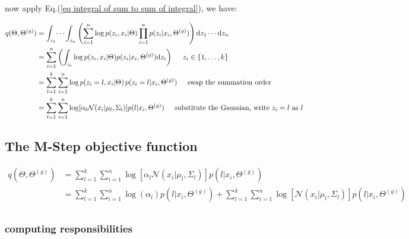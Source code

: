 \documentclass{article}
\def\d{\text{d}}
\begin{document}
now apply Eq.(\ref{eq integral of sum to sum of integral}), we have:

\begin{equation}\begin{split}
q(\Theta, \Theta^{(g)}) &=  \int_{z_1} \dots \int_{z_n} \left( \sum_{i=1}^{n} \log p(z_i , x_i | \Theta) \prod_{i=1}^n p(z_i|x_i,\Theta^{(g)}) \right) \d z_1 \cdots \d z_n \\
&= \sum_{i=1}^{n} \left(  \int_{z_i}  \log p(z_i , x_i | \Theta)  p(z_i|x_i,\Theta^{(g)}) \d z_i \right)  \hspace{5 mm} z_i \in \{1,\dots, k\} \\
&= \sum_{l=1}^k  \sum_{i=1}^{n}  \log p(z_i = l , x_i | \Theta)\, p(z_i = l|x_i,\Theta^{(g)}) \hspace{5 mm} \text{swap the summation order}\\
&= \sum_{l=1}^k  \sum_{i=1}^{n}  \log [ \alpha_{l} \mathcal{N}(x_i | \mu_{l}, \Sigma_{l} )] p(l|x_i,\Theta^{(g)})  \hspace{5 mm} \text{substitute the Gaussian, write } z_i = l \text{ as } l\\
\end{split}\end{equation}




\subsection{The M-Step objective function}


\begin{equation}\begin{split}\label{eq M-Step objective function}
q(\Theta, \Theta^{(g)}) &= \sum_{l=1}^k  \sum_{i=1}^{n}  \log [ \alpha_{l} \mathcal{N}(x_i | \mu_{l}, \Sigma_{l} )] p(l|x_i,\Theta^{(g)})\\
&= \sum_{l=1}^k  \sum_{i=1}^{n}  \log ( \alpha_{l}) p(l|x_i,\Theta^{(g)}) +  \sum_{l=1}^k  \sum_{i=1}^{n} \log [\mathcal{N}(x_i | \mu_{l}, \Sigma_{l} ) ] p(l|x_i,\Theta^{(g)})\\
\end{split}\end{equation}

\subsubsection{computing responsibilities}
\end{document}
